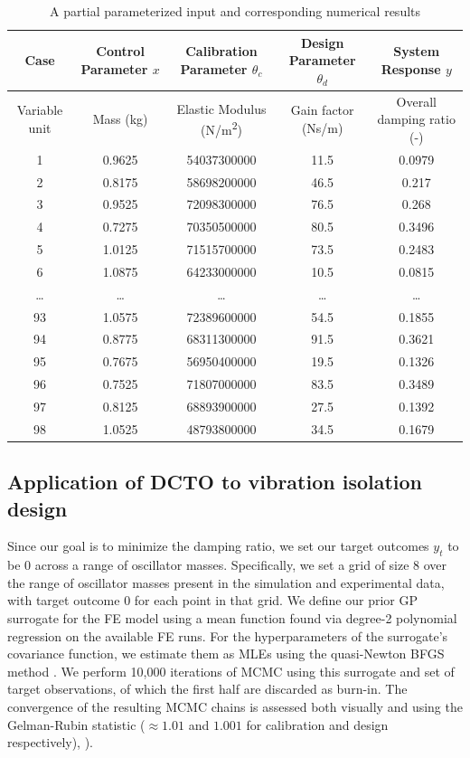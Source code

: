 \documentclass[10pt]{asme2ej}
\begin{document}
\begin{table}
	\centering
	\captionsetup{width=.85\linewidth}
	\caption{A partial parameterized input and corresponding numerical results} 
	\renewcommand{\arraystretch}{1.2}%
	\begin{tabular}{c|cccc}
		\hline
		Case&
		Control Parameter $x$&Calibration Parameter $\theta_c$&Design Parameter $\theta_d$&System Response $y$\\
		\hline\hline
		Variable unit&Mass (kg)&Elastic Modulus (N/m\textsuperscript{2})&Gain factor (Ns/m)&Overall damping ratio (-)\\
		\hline
		1&	0.9625&	54037300000&	11.5&	0.0979\\
		2&	0.8175&	58698200000&	46.5&	0.217\\
		3&	0.9525&	72098300000&	76.5&	0.268\\
		4&	0.7275&	70350500000&	80.5&	0.3496\\
		5&	1.0125&	71515700000&	73.5&	0.2483\\
		6&	1.0875&	64233000000&	10.5&	0.0815\\
		\ldots&\ldots&\ldots&\ldots&\ldots\\
		93&	1.0575&	72389600000&	54.5&	0.1855\\
		94&	0.8775&	68311300000&	91.5&	0.3621\\
		95&	0.7675&	56950400000&	19.5&	0.1326\\
		96&	0.7525&	71807000000&	83.5&	0.3489\\
		97&	0.8125&	68893900000&	27.5&	0.1392\\
		98&	1.0525&	48793800000&	34.5&	0.1679\\
		\hline
	\end{tabular}
	\label{table:params}
\end{table}
%

%
\subsection{Application of DCTO to vibration isolation design}
%
Since our goal is to minimize the damping ratio, we set our target outcomes $y_t$ to be 0 across a range of oscillator masses.
%
Specifically, we set a grid of size 8 over the range of oscillator masses present in the simulation and experimental data, with target outcome 0 for each point in that grid.
%
We define our prior GP surrogate for the FE model using a mean function found via degree-2 polynomial regression on the available FE runs.
%
For the hyperparameters of the surrogate's covariance function, we estimate them as MLEs using the quasi-Newton BFGS method \cite{Fletcher2013}.
%
We perform 10,000 iterations of MCMC using this surrogate and set of target observations, of which the first half are discarded as burn-in.
%
The convergence of the resulting MCMC chains is assessed both visually and using the Gelman-Rubin statistic ($\approx1.01$ and $1.001$ for calibration and design respectively), \cite{Gelman1992a}).
%
\end{document}
